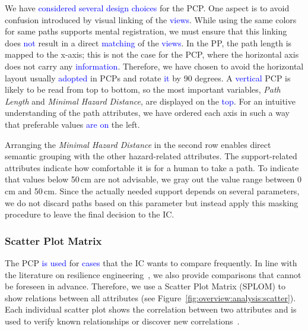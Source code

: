\documentclass{egpubl}
\newcommand{\diff}[1]{\textcolor{blue}{#1}}
\begin{document}
We have \diff{considered several design choices} for the PCP. One aspect is to avoid confusion introduced by visual linking of the \diff{views}. While using the same colors for same paths supports mental registration, we must ensure that this linking does \diff{not} result in a direct \diff{matching} of the \diff{views}. In the PP, the path length is mapped to the x-axis; this is not the case for the PCP, where the horizontal axis does not carry any \diff{information}. Therefore, we have chosen to avoid the horizontal layout usually \diff{adopted} in PCPs and rotate \diff{it} by 90 degrees. A \diff{vertical} PCP is likely to be read from top to bottom, so the most important variables, \emph{Path Length} and \emph{Minimal Hazard Distance}, are displayed on the \diff{top}. For an intuitive understanding of the path attributes, we have ordered each axis in such a way that preferable values \diff{are on} the left. 

Arranging the \emph{Minimal Hazard Distance} in the second row enables direct semantic grouping with the other hazard-related attributes. The support-related attributes indicate how comfortable it is for a human to take a path. To indicate that values below 50\,cm are not advisable, we gray out the value range between 0\,cm and 50\,cm. Since the actually needed support depends on several parameters, we do not discard paths based on this parameter but instead apply this masking procedure to leave the final decision to the IC.

\subsubsection{Scatter Plot Matrix} \label{sec:overview:analysis:scatter}
The PCP \diff{is used} for \diff{cases} that the IC wants to compare frequently. In line with the literature on resilience engineering~\cite{Lundberg2012}, we also provide comparisons that cannot be foreseen in advance. Therefore, we use a Scatter Plot Matrix (SPLOM) to show relations between all attributes (see Figure~\ref{fig:overview:analysis:scatter}). Each individual scatter plot shows the correlation between two attributes and is used to verify known relationships or discover new correlations~\cite{Li2008}.
\end{document}
